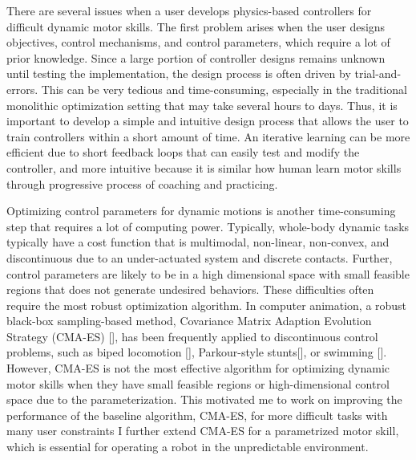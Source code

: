 There are several issues when a user develops physics-based controllers
for difficult dynamic motor skills.
The first problem arises when the user designs objectives, control 
mechanisms, and control parameters, which require a lot of prior knowledge.
Since a large portion of controller designs remains unknown until testing
the implementation, the design process is often driven by trial-and-errors.
This can be very tedious and time-consuming, especially in the traditional
monolithic optimization setting that may take several hours to days.
Thus, it is important to develop a simple and intuitive design process
that allows the user to train controllers within a short amount of time.
An iterative learning can be more efficient due to 
short feedback loops that can easily test and modify the controller,
and more intuitive because it is similar how human learn motor skills
through progressive process of coaching and practicing.

Optimizing control parameters for dynamic motions is another time-consuming
step that requires a lot of computing power.
Typically, whole-body dynamic tasks typically have a cost function
that is multimodal, non-linear, non-convex, and discontinuous due to 
an under-actuated system and discrete contacts.
Further, control parameters are likely to be in a high dimensional
space with small feasible regions that does not generate undesired behaviors.
These difficulties often require the most robust optimization algorithm.
In computer animation, a robust black-box sampling-based method, 
Covariance Matrix Adaption Evolution Strategy (CMA-ES) [], has been frequently
applied to discontinuous control problems, such as biped locomotion [],
Parkour-style stunts[], or swimming [].
However, CMA-ES is not the most effective algorithm for
optimizing dynamic motor skills when they have small feasible regions
or high-dimensional control space due to the parameterization.
This motivated me to work on improving the performance of the baseline
algorithm, CMA-ES, for more difficult tasks with many user constraints
I further extend CMA-ES for a parametrized motor skill, which is essential
for operating a robot in the unpredictable environment.

